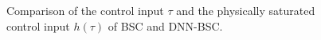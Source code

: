 \begin{figure}[!t]
    \centering
    \vfill
    \caption{Comparison of the control input $\tau$ and the physically saturated control input $h(\tau)$ of BSC and DNN-BSC.}
    \label{chap4:fig:control1}
\end{figure}

